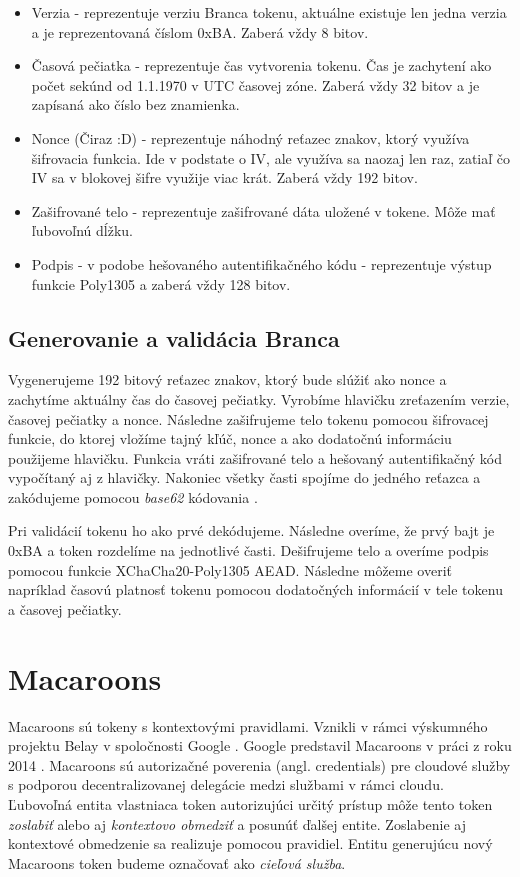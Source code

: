 \begin{itemize}
    \item Verzia - reprezentuje verziu Branca tokenu, aktuálne existuje len jedna verzia a je reprezentovaná číslom 0xBA. Zaberá vždy 8 bitov.
    \item Časová pečiatka - reprezentuje čas vytvorenia tokenu. Čas je zachytení ako počet sekúnd od 1.1.1970 v UTC časovej zóne. Zaberá vždy 32 bitov a je zapísaná ako číslo bez znamienka.
    \item Nonce (Čiraz :D) - reprezentuje náhodný reťazec znakov, ktorý využíva šifrovacia funkcia. Ide v podstate o IV, ale využíva sa naozaj len raz, zatiaľ čo IV sa v blokovej šifre využije viac krát. Zaberá vždy 192 bitov.
    \item Zašifrované telo - reprezentuje zašifrované dáta uložené v tokene. Môže mať ľubovoľnú dĺžku.
    \item Podpis - v podobe hešovaného autentifikačného kódu - reprezentuje výstup funkcie Poly1305 a zaberá vždy 128 bitov.
\end{itemize}

\subsection{Generovanie a validácia Branca}

Vygenerujeme 192 bitový reťazec znakov, ktorý bude slúžiť ako nonce a zachytíme aktuálny čas do časovej pečiatky. Vyrobíme hlavičku zreťazením verzie, časovej pečiatky a nonce. Následne zašifrujeme telo tokenu pomocou šifrovacej funkcie, do ktorej vložíme tajný kľúč, nonce a ako dodatočnú informáciu použijeme hlavičku. Funkcia vráti zašifrované telo a hešovaný autentifikačný kód vypočítaný aj z hlavičky. Nakoniec všetky časti spojíme do jedného reťazca a zakódujeme pomocou \textit{base62} kódovania \cite{base62}.

Pri validácií tokenu ho ako prvé dekódujeme. Následne overíme, že prvý bajt je 0xBA a token rozdelíme na jednotlivé časti. Dešifrujeme telo a overíme podpis pomocou funkcie XChaCha20-Poly1305 AEAD. Následne môžeme overiť napríklad časovú platnosť tokenu pomocou dodatočných informácií v tele tokenu a časovej pečiatky.

\section{Macaroons}

Macaroons sú tokeny s kontextovými pravidlami. Vznikli v rámci výskumného projektu Belay v spoločnosti Google \cite{belay}. Google predstavil Macaroons v práci z roku 2014 \cite{macaroons_paper}. Macaroons sú autorizačné poverenia (angl. credentials) pre cloudové služby s podporou decentralizovanej delegácie medzi službami v rámci cloudu. Ľubovoľná entita vlastniaca token autorizujúci určitý prístup môže tento token \textit{zoslabiť} alebo aj \textit{kontextovo obmedziť} a posunúť ďalšej entite. Zoslabenie aj kontextové obmedzenie sa realizuje pomocou pravidiel. Entitu generujúcu nový Macaroons token budeme označovať ako \textit{cieľová služba}.

